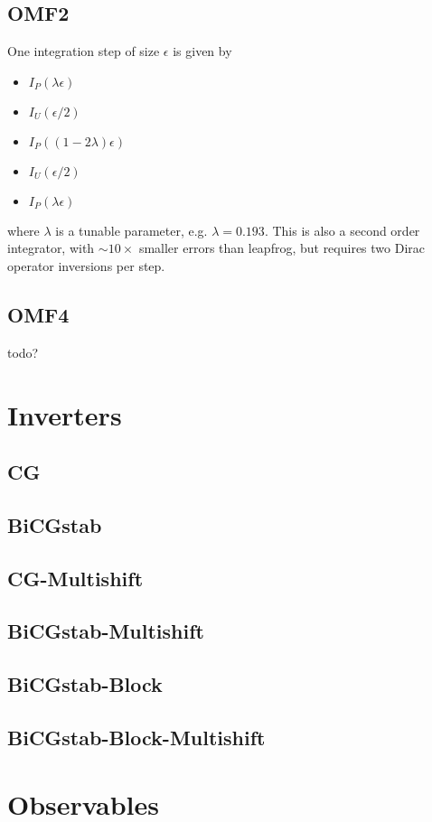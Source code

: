 \documentclass[a4paper,12pt]{article}
\begin{document}
\subsection{OMF2}
One integration step of size $\epsilon$ is given by
\begin{itemize}
 \item $I_P(\lambda \epsilon)$
 \item $I_U(\epsilon/2)$
 \item $I_P((1-2\lambda) \epsilon)$
 \item $I_U(\epsilon/2)$
 \item $I_P(\lambda \epsilon)$
\end{itemize}
where $\lambda$ is a tunable parameter, e.g. $\lambda = 0.193$. This is also a second order integrator, 
with $\sim10\times$ smaller errors than leapfrog, but requires two Dirac operator inversions per step.

\subsection{OMF4}
todo?

\section{Inverters}
\subsection{CG}
\subsection{BiCGstab}
\subsection{CG-Multishift}
\subsection{BiCGstab-Multishift}
\subsection{BiCGstab-Block}
\subsection{BiCGstab-Block-Multishift}

\section{Observables}
\end{document}
